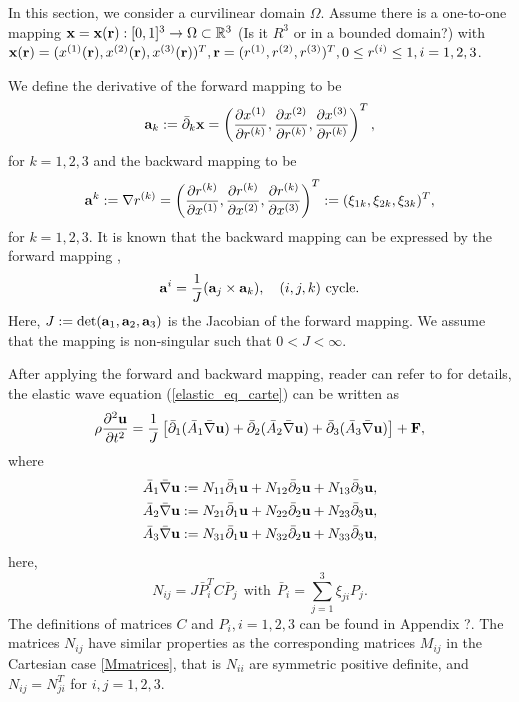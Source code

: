 \documentclass[a4paper]{article}
\begin{document}
In this section, we consider a curvilinear domain $\Omega$. Assume there is a one-to-one mapping {\color{blue}${\bf x} = {\bf x}({\bf r}) : [0,1]^3 \rightarrow \Omega \subset \mathbb{R}^3$} {\color{blue}{it is $R^3$}}{\color{red}(Is it $R^3$ or in a bounded domain?)} with ${\bf x}({\bf r}) = (x^{(1)}({\bf r}),x^{(2)}({\bf r}),x^{(3)}({\bf r}))^T, {\bf r} = (r^{(1)},r^{(2)},r^{(3)})^T, 0\leq r^{(i)}\leq1, i = 1,2,3$.

We define the derivative of the forward mapping to be 
\begin{equation}\label{elastic_eq_carte}
{\bf a}_k := \bar{\partial}_k{\bf x} = \left(\frac{\partial x^{(1)}}{\partial r^{(k)}},\frac{\partial x^{(2)}}{\partial r^{(k)}},\frac{\partial x^{(3)}}{\partial r^{(k)}}\right)^T,
\end{equation}
for $k = 1,2,3$ and the backward mapping to be
\begin{equation*}
{\bf a}^k := \nabla r^{(k)} = \left(\frac{\partial r^{(k)}}{\partial x^{(1)}},\frac{\partial r^{(k)}}{\partial x^{(2)}},\frac{\partial r^{(k)}}{\partial x^{(3)}}\right)^T := (\xi_{1k},\xi_{2k},\xi_{3k})^T,
\end{equation*}
for $k = 1,2,3$. It is known that the backward mapping can be expressed by the forward mapping \cite{?}, 
\begin{equation*}
{\bf a}^i = \frac{1}{J}({\bf a}_j\times{\bf a}_k), \ \ \ (i,j,k) \ \text{cycle}.
\end{equation*}
Here, $J:=\text{det}({\bf a}_1, {\bf a}_2, {\bf a}_3)$ is the Jacobian of the forward mapping. We assume that the mapping is non-singular such that  $0<J<\infty$.

After applying the forward and backward mapping, reader can refer to \cite{?} for details, the elastic wave equation (\ref{elastic_eq_carte}) can be written as
\begin{equation}\label{elastic_eq_curvi}
\rho\frac{\partial^2 {\bf u}}{\partial t^2} = \frac{1}{J}\left[\bar{\partial }_1(\bar{A}_1\bar{\nabla}{\bf u}) + \bar{\partial }_2(\bar{A}_2\bar{\nabla}{\bf u}) +\bar{\partial }_3(\bar{A}_3\bar{\nabla}{\bf u}) \right] + {\bf F},
\end{equation}
where
\begin{align*}
	\bar{A}_1\bar{\nabla}{\bf u} &:= N_{11}\bar{\partial}_1{\bf u} + N_{12}\bar{\partial}_2{\bf u} + N_{13}\bar{\partial}_3{\bf u}, \\
	\bar{A}_2\bar{\nabla}{\bf u} &:= N_{21}\bar{\partial}_1{\bf u} + N_{22}\bar{\partial}_2{\bf u} + N_{23}\bar{\partial}_3{\bf u}, \\
	\bar{A}_3\bar{\nabla}{\bf u} &:= N_{31}\bar{\partial}_1{\bf u} + N_{32}\bar{\partial}_2{\bf u} + N_{33}\bar{\partial}_3{\bf u},
\end{align*}
here, 
\begin{equation}\label{definition_Nij}
N_{ij} = J\bar{P}_i^TC\bar{P}_j \ \ \text{with} \ \ \bar{P}_i = \sum_{j=1}^3\xi_{ji}P_j.
\end{equation}
The definitions of matrices $C$ and $P_i, i = 1,2,3$ can be found in Appendix ?. The matrices $N_{ij}$ have similar properties as the corresponding matrices $M_{ij}$ in the Cartesian case \eqref{Mmatrices}, that is $N_{ii}$ are symmetric positive definite, and $N_{ij}=N_{ji}^T$ for $i,j=1,2,3$.
\end{document}
